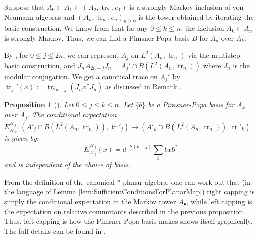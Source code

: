 \documentclass[11pt]{article}
\theoremstyle{plain}
\newtheorem{prop}[thm]{Proposition}
\theoremstyle{definition}
\DeclareMathOperator{\tr}{tr}
\begin{document}
Suppose that $A_0\subset A_1 \subset \left(A_2,\tr_2,e_1\right)$ is a strongly Markov inclusion of von Neumann algebras and $\left(A_n,\tr_n,e_n\right)_{n\geq 0}$ is the tower obtained by iterating the basic construction. 
We know from \cite[Cor.~2.18]{MR2812459} that for any $0\leq k \leq n$, the inclusion $A_k \subset A_n$ is strongly Markov. 
Thus, we can find a Pimsner-Popa basis $B$ for $A_n$ over $A_k$.

By \cite[Prop.~2.20]{MR2812459}, for $0\leq j\leq 2n$, we can represent $A_j$ on $L^2(A_n, \tr_n)$ via the multistep basic construction, and $J_n A_{2n-j} J_n = A_j'\cap B(L^2(A_n, \tr_n))$ where $J_n$ is the modular conjugation.
We get a canonical trace on $A_j'$ by $\tr_j'(x):=\tr_{2n-j}(J_n x^*J_n)$ as discussed in Remark \cite[Rem.~2.21]{MR2812459}.


\begin{prop}[{\cite[Prop.~2.24]{MR2812459}}]
\label{prop:LeftCapping}
Let $0\leq j \leq k \leq n $. 
Let $\{b\}$ be a Pimsner-Popa basis for $A_k$ over $A_j$.
The conditional expectation $E_{A'_k}^{A'_j}: (A'_j\cap B(L^2(A_n,\tr_n)),\tr'_j)\rightarrow (A'_k \cap B(L^2(A_n,\tr_n)),\tr'_k)$ is given by:
\[
E^{A'_j}_{A'_k}(x)
=
d^{-2(k-j)} \sum_{b } bxb^{\ast}
\]
and is independent of the choice of basis.
\end{prop}
From the definition of the canonical $\ast$-planar algebra, one can work out that (in the language of Lemma \ref{lem:SufficientConditionsForPlanarMap}) right capping is simply the conditional expectation in the Markov tower $A_\bullet$, while left capping is the expectation on relative commutants described in the previous proposition. Thus, left capping is how the Pimsner-Popa basis makes shows itself graphically. The full details can be found in \cite[Prop.~2.47]{MR2812459}. 
\end{document}
